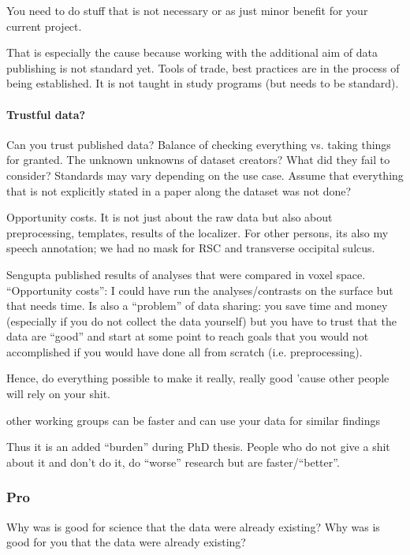You need to do stuff that is not necessary or as just minor benefit for your
current project.

%
That is especially the cause because working with the additional aim of data
publishing is not standard yet.
%
Tools of trade, best practices are in the process of being established.
%
It is not taught in study programs (but needs to be standard).


\paragraph{Trustful data?}

%
Can you trust published data? Balance of checking everything vs.
taking things for granted.
%
The unknown unknowns of dataset creators? What did they fail to consider?
Standards may vary depending on the use case. Assume that everything that is not
explicitly stated in a paper along the dataset was not done?

%
Opportunity costs. It is not just about the raw data but also about
preprocessing, templates, results of the localizer. For other persons, its also
my speech annotation; we had no mask for RSC and transverse occipital sulcus.

Sengupta published results of analyses that were compared in voxel space.
%
``Opportunity costs'': I could have run the analyses/contrasts on the surface
but that needs time.
%
Is also a ``problem'' of data sharing: you save time and money (especially if
you do not collect the data yourself) but you have to trust that the data are
``good'' and start at some point to reach goals that you would not accomplished
if you would have done all from scratch (i.e. preprocessing).

%
Hence, do everything possible to make it really, really good 'cause other people
will rely on your shit.

%
other working groups can be faster and can use your data for similar findings

%
Thus it is an added ``burden'' during PhD thesis.
%
People who do not give a shit about it and don't do it, do ``worse'' research
but are faster/``better''.


\subsubsection{Pro}
%
Why was is good for science that the data were already existing?
%
Why was is good for you that the data were already existing?

